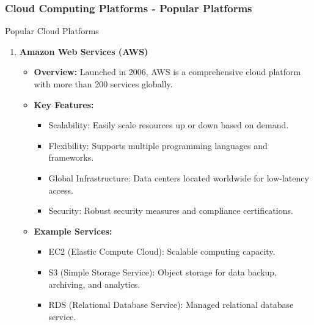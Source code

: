 \documentclass[aspectratio=169]{beamer}
\begin{document}
\begin{frame}[fragile]
    \frametitle{Cloud Computing Platforms - Popular Platforms}
    \begin{block}{Popular Cloud Platforms}
        \begin{enumerate}
            \item \textbf{Amazon Web Services (AWS)}
                \begin{itemize}
                    \item \textbf{Overview:} Launched in 2006, AWS is a comprehensive cloud platform with more than 200 services globally.
                    \item \textbf{Key Features:}
                        \begin{itemize}
                            \item Scalability: Easily scale resources up or down based on demand.
                            \item Flexibility: Supports multiple programming languages and frameworks.
                            \item Global Infrastructure: Data centers located worldwide for low-latency access.
                            \item Security: Robust security measures and compliance certifications.
                        \end{itemize}
                    \item \textbf{Example Services:}
                        \begin{itemize}
                            \item EC2 (Elastic Compute Cloud): Scalable computing capacity.
                            \item S3 (Simple Storage Service): Object storage for data backup, archiving, and analytics.
                            \item RDS (Relational Database Service): Managed relational database service.
                        \end{itemize}
                \end{itemize}
            

\end{enumerate}
\end{block}
\end{frame}
\end{document}
